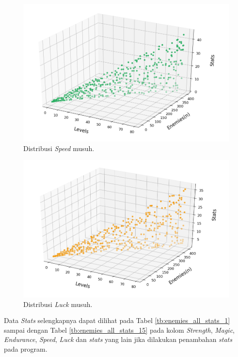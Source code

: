 \begin{figure} [!h] \centering
	\includegraphics[scale=0.58]{img/EnemySpeedDistrib.png}
	\caption{Distribusi \textit{Speed} musuh.}
	\label{fig:enemy_spd_distrib}
\end{figure}

\begin{figure} [!h] \centering
	\includegraphics[scale=0.58]{img/EnemyLuckDistrib.png}
	\caption{Distribusi \textit{Luck} musuh.}
	\label{fig:enemy_luck_distrib}
\end{figure}

Data \textit{Stats} selengkapnya dapat dilihat pada Tabel \ref{tb:enemies_all_stats_1} sampai dengan Tabel \ref{tb:enemies_all_stats_15} pada kolom \textit{Strength}, \textit{Magic}, \textit{Endurance}, \textit{Speed}, \textit{Luck} dan \textit{stats} yang lain jika dilakukan penambahan \textit{stats} pada program. 